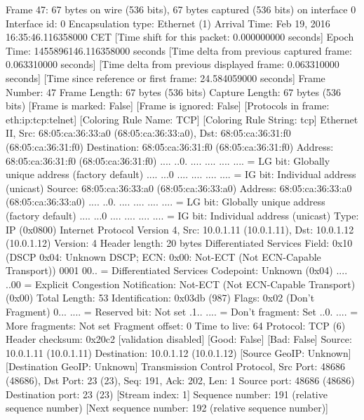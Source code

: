 Frame 47: 67 bytes on wire (536 bits), 67 bytes captured (536 bits) on interface 0
    Interface id: 0
    Encapsulation type: Ethernet (1)
    Arrival Time: Feb 19, 2016 16:35:46.116358000 CET
    [Time shift for this packet: 0.000000000 seconds]
    Epoch Time: 1455896146.116358000 seconds
    [Time delta from previous captured frame: 0.063310000 seconds]
    [Time delta from previous displayed frame: 0.063310000 seconds]
    [Time since reference or first frame: 24.584059000 seconds]
    Frame Number: 47
    Frame Length: 67 bytes (536 bits)
    Capture Length: 67 bytes (536 bits)
    [Frame is marked: False]
    [Frame is ignored: False]
    [Protocols in frame: eth:ip:tcp:telnet]
    [Coloring Rule Name: TCP]
    [Coloring Rule String: tcp]
Ethernet II, Src: 68:05:ca:36:33:a0 (68:05:ca:36:33:a0), Dst: 68:05:ca:36:31:f0 (68:05:ca:36:31:f0)
    Destination: 68:05:ca:36:31:f0 (68:05:ca:36:31:f0)
        Address: 68:05:ca:36:31:f0 (68:05:ca:36:31:f0)
        .... ..0. .... .... .... .... = LG bit: Globally unique address (factory default)
        .... ...0 .... .... .... .... = IG bit: Individual address (unicast)
    Source: 68:05:ca:36:33:a0 (68:05:ca:36:33:a0)
        Address: 68:05:ca:36:33:a0 (68:05:ca:36:33:a0)
        .... ..0. .... .... .... .... = LG bit: Globally unique address (factory default)
        .... ...0 .... .... .... .... = IG bit: Individual address (unicast)
    Type: IP (0x0800)
Internet Protocol Version 4, Src: 10.0.1.11 (10.0.1.11), Dst: 10.0.1.12 (10.0.1.12)
    Version: 4
    Header length: 20 bytes
    Differentiated Services Field: 0x10 (DSCP 0x04: Unknown DSCP; ECN: 0x00: Not-ECT (Not ECN-Capable Transport))
        0001 00.. = Differentiated Services Codepoint: Unknown (0x04)
        .... ..00 = Explicit Congestion Notification: Not-ECT (Not ECN-Capable Transport) (0x00)
    Total Length: 53
    Identification: 0x03db (987)
    Flags: 0x02 (Don't Fragment)
        0... .... = Reserved bit: Not set
        .1.. .... = Don't fragment: Set
        ..0. .... = More fragments: Not set
    Fragment offset: 0
    Time to live: 64
    Protocol: TCP (6)
    Header checksum: 0x20c2 [validation disabled]
        [Good: False]
        [Bad: False]
    Source: 10.0.1.11 (10.0.1.11)
    Destination: 10.0.1.12 (10.0.1.12)
    [Source GeoIP: Unknown]
    [Destination GeoIP: Unknown]
Transmission Control Protocol, Src Port: 48686 (48686), Dst Port: 23 (23), Seq: 191, Ack: 202, Len: 1
    Source port: 48686 (48686)
    Destination port: 23 (23)
    [Stream index: 1]
    Sequence number: 191    (relative sequence number)
    [Next sequence number: 192    (relative sequence number)]
